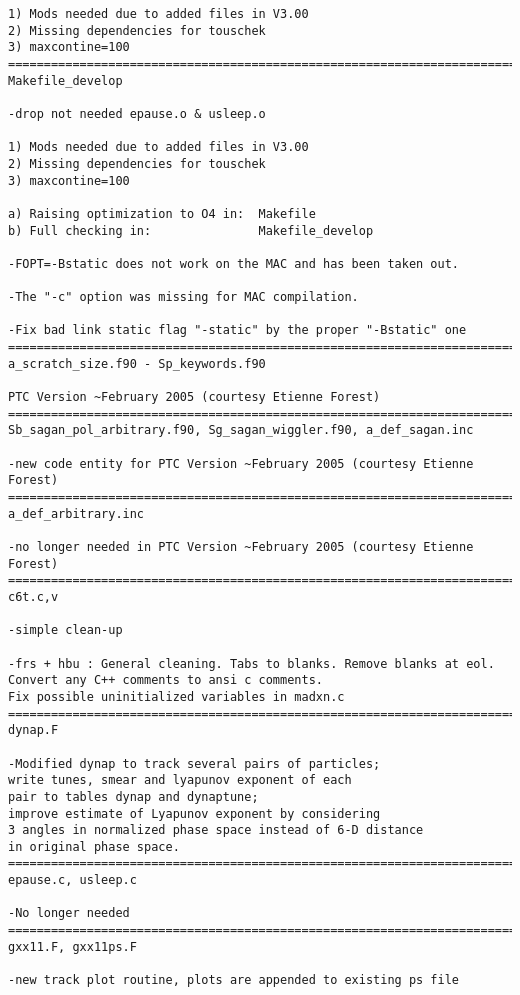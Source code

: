 \begin{verbatim}
1) Mods needed due to added files in V3.00
2) Missing dependencies for touschek
3) maxcontine=100
=============================================================================
Makefile_develop

-drop not needed epause.o & usleep.o

1) Mods needed due to added files in V3.00
2) Missing dependencies for touschek
3) maxcontine=100

a) Raising optimization to O4 in:  Makefile
b) Full checking in:               Makefile_develop

-FOPT=-Bstatic does not work on the MAC and has been taken out.

-The "-c" option was missing for MAC compilation.

-Fix bad link static flag "-static" by the proper "-Bstatic" one
=============================================================================
a_scratch_size.f90 - Sp_keywords.f90

PTC Version ~February 2005 (courtesy Etienne Forest)
=============================================================================
Sb_sagan_pol_arbitrary.f90, Sg_sagan_wiggler.f90, a_def_sagan.inc

-new code entity for PTC Version ~February 2005 (courtesy Etienne Forest)
=============================================================================
a_def_arbitrary.inc

-no longer needed in PTC Version ~February 2005 (courtesy Etienne Forest)
=============================================================================
c6t.c,v

-simple clean-up

-frs + hbu : General cleaning. Tabs to blanks. Remove blanks at eol.
Convert any C++ comments to ansi c comments.
Fix possible uninitialized variables in madxn.c
=============================================================================
dynap.F

-Modified dynap to track several pairs of particles;
write tunes, smear and lyapunov exponent of each
pair to tables dynap and dynaptune;
improve estimate of Lyapunov exponent by considering
3 angles in normalized phase space instead of 6-D distance
in original phase space.
=============================================================================
epause.c, usleep.c

-No longer needed
=============================================================================
gxx11.F, gxx11ps.F

-new track plot routine, plots are appended to existing ps file


\end{verbatim}
